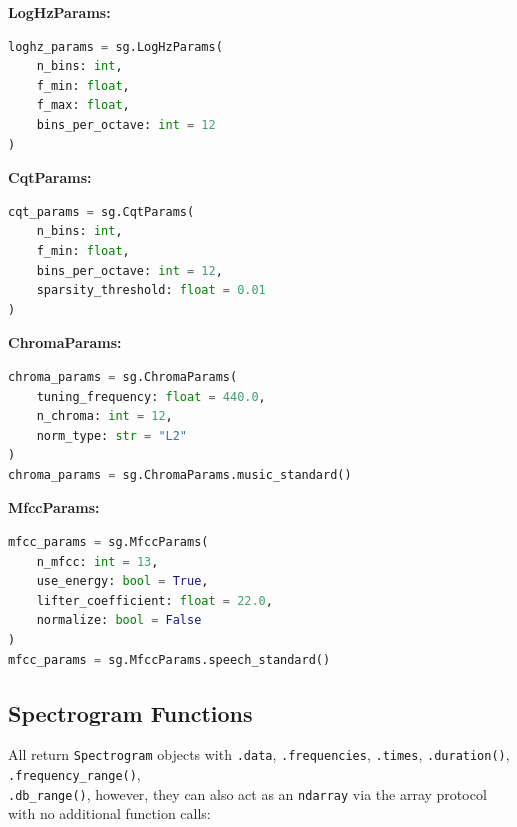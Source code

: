 \textbf{LogHzParams:}

\begin{lstlisting}[language=Python, caption={LogHzParams constructor with octave resolution}]
loghz_params = sg.LogHzParams(
    n_bins: int,
    f_min: float,
    f_max: float,
    bins_per_octave: int = 12
)
\end{lstlisting}

\textbf{CqtParams:}

\begin{lstlisting}[language=Python, caption={CqtParams constructor with sparsity threshold}]
cqt_params = sg.CqtParams(
    n_bins: int,
    f_min: float,
    bins_per_octave: int = 12,
    sparsity_threshold: float = 0.01
)
\end{lstlisting}

\textbf{ChromaParams:}

\begin{lstlisting}[language=Python, caption={ChromaParams constructor and music preset}]
chroma_params = sg.ChromaParams(
    tuning_frequency: float = 440.0,
    n_chroma: int = 12,
    norm_type: str = "L2"
)
chroma_params = sg.ChromaParams.music_standard()
\end{lstlisting}

\textbf{MfccParams:}

\begin{lstlisting}[language=Python, caption={MfccParams constructor and speech preset}]
mfcc_params = sg.MfccParams(
    n_mfcc: int = 13,
    use_energy: bool = True,
    lifter_coefficient: float = 22.0,
    normalize: bool = False
)
mfcc_params = sg.MfccParams.speech_standard()
\end{lstlisting}

\subsection*{Spectrogram Functions}

All return \texttt{Spectrogram} objects with \texttt{.data},
\texttt{.frequencies},
\texttt{.times}, \texttt{.duration()},
\texttt{.frequency\_range()},\\ \texttt{.db\_range()}, however, they
can also act as an \texttt{ndarray} via the array protocol with no
additional function calls:

